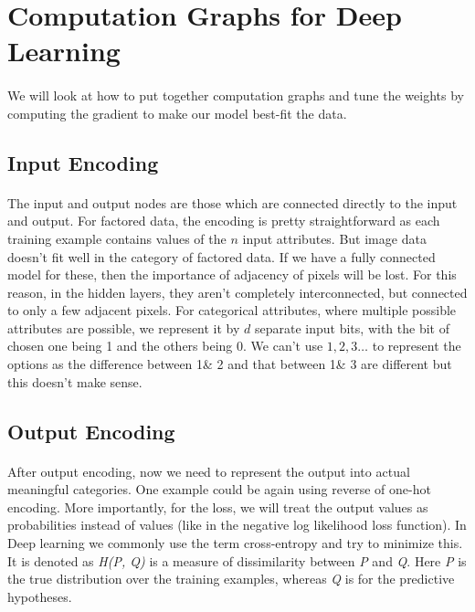 \documentclass{article}
\begin{document}
\newpage
\section{Computation Graphs for Deep Learning}
  \paragraph{} We will look at how to put together computation graphs and tune the weights by computing the gradient to make our model best-fit the data.
    \subsection{Input Encoding}
      \paragraph{} The input and output nodes are those which are connected directly to the input and output. For factored data, the encoding is pretty straightforward as each training example contains values of the $n$ input attributes. But  image data doesn’t fit well in the category of factored data. If we have a fully connected model for these, then the importance of adjacency of pixels will be lost. For this reason, in the hidden layers, they aren’t completely interconnected, but connected to only a few adjacent pixels. For categorical attributes, where multiple possible attributes are possible, we represent it by $d$ separate input bits, with the bit of chosen one being 1 and the others being 0. We can't use $1,2,3 \ldots$ to represent the options as the difference between 1\& 2 and that between 1\& 3 are different but this doesn't make sense.
    \subsection{Output Encoding}
      \paragraph{} After output encoding, now we need to represent the output into  actual meaningful categories. One example could be again using reverse of one-hot encoding. More importantly, for the loss, we will treat the output values as probabilities instead of values (like in the negative log likelihood loss function). In Deep learning we commonly use the term cross-entropy and try to minimize this. It is denoted as \textit{H(P, Q)} is a measure of dissimilarity between \textit{P} and \textit{Q}. Here \textit{P} is the true distribution over the training examples, whereas \textit{Q} is for the predictive hypotheses.
\end{document}
